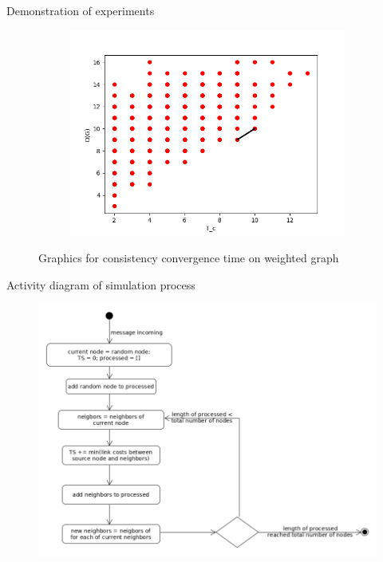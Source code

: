 \documentclass[aspectratio=43]{beamer}
\begin{document}
\begin{frame}{Demonstration of experiments}
\begin{figure}[p]
\begin{subfigure}{0.4\linewidth}
\centering\includegraphics[width=\linewidth]{images/1000-consistency-convergence-weighted.png}
\end{subfigure}
\caption{Graphics for consistency convergence time on weighted graph}
\end{figure}

\end{frame}

\begin{frame}{Activity diagram of simulation process}

\begin{figure}
\centering\includegraphics[width=\linewidth]{images/message-broadcasting-state-machine.png}
\end{figure}

\end{frame}
\end{document}
